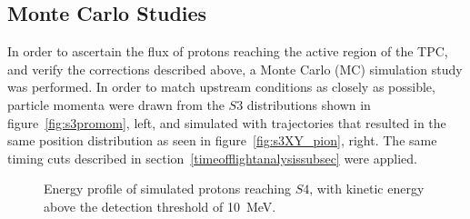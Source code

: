 \subsection{Monte Carlo Studies}
In order to ascertain the flux of protons reaching the active region of the TPC, and verify the corrections described above, a Monte Carlo (MC) simulation study was performed. 
In order to match upstream conditions as closely as possible, particle momenta were drawn from the $\mathit{S3}$ distributions shown in figure~\ref{fig:s3promom}, left, and simulated with trajectories that resulted in the same position distribution as seen in figure~\ref{fig:s3XY_pion}, right.
The same timing cuts described in section~\ref{timeofflightanalysissubsec} were applied.

%      

\begin{figure}[ht]
  \centering
     \begin{adjustbox}{max totalsize={\textwidth}{.35\textheight}, center}
      
    \end{adjustbox}
    \caption{Energy profile of simulated protons reaching $\mathit{S4}$, with kinetic energy above the detection threshold of 10~MeV.}
    \label{fig:MCS4}
\end{figure}


